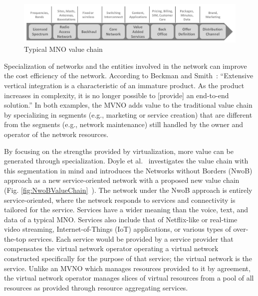 \documentclass[12pt,dvipsnames]{report}
\begin{document}
\begin{figure}
	\centering
	\includegraphics[width=\linewidth]{ClassicNetworkValueChain}
	\caption[Typical MNO value chain]{\small Typical MNO value chain~\cite{6737248}}
	\label{fig:ClassicNetworkValueChain}
\end{figure}

Specialization of networks and the entities involved in the network can improve the cost efficiency of the network.  According to Beckman and Smith~\cite{1421931}: ``Extensive vertical integration is a characteristic of an immature product.  As the product increases in complexity, it is no longer possible to [provide] an end-to-end solution.'' In both examples, the MVNO adds value to the traditional value chain by specializing in segments (e.g., marketing or service creation) that are different from the segments (e.g., network maintenance) still handled by the owner and operator of the network resources.

By focusing on the strengths provided by virtualization, more value can be generated through specialization.  Doyle et al.~\cite{6737248} investigates the value chain with this segmentation in mind and introduces the Networks without Borders (NwoB) approach as a new service-oriented network with a proposed new value chain (Fig. \ref{fig:NwoBValueChain}~\cite{6737248}).  The network under the NwoB approach is entirely service-oriented, where the network responds to services and connectivity is tailored for the service.  Services have a wider meaning than the voice, text, and data of a typical MNO.  Services also include that of Netflix-like or real-time video streaming, Internet-of-Things (IoT) applications, or various types of over-the-top services.  Each service would be provided by a service provider that compensates the virtual network operator operating a virtual network constructed specifically for the purpose of that service; the virtual network is the service.  Unlike an MVNO which manages resources provided to it by agreement, the virtual network operator manages slices of virtual resources from a pool of all resources as provided through resource aggregating services.
\end{document}

